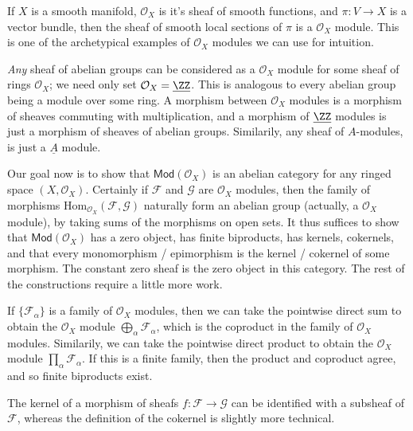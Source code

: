 \begin{example}
    If $X$ is a smooth manifold, $\mathcal{O}_X$ is it's sheaf of smooth functions, and $\pi: V \to X$ is a vector bundle, then the sheaf of smooth local sections of $\pi$ is a $\mathcal{O}_X$ module. This is one of the archetypical examples of $\mathcal{O}_X$ modules we can use for intuition.
\end{example}

\emph{Any} sheaf of abelian groups can be considered as a $\mathcal{O}_X$ module for some sheaf of rings $\mathcal{O}_X$; we need only set $\mathcal{O}_X = \underline{\ZZ}$. This is analogous to every abelian group being a module over some ring. A morphism between $\mathcal{O}_X$ modules is a morphism of sheaves commuting with multiplication, and a morphism of $\underline{\ZZ}$ modules is just a morphism of sheaves of abelian groups. Similarily, any sheaf of $A$-modules, is just a $\underline{A}$ module.

Our goal now is to show that $\mathsf{Mod}(\mathcal{O}_X)$ is an abelian category for any ringed space $(X,\mathcal{O}_X)$. Certainly if $\mathcal{F}$ and $\mathcal{G}$ are $\mathcal{O}_X$ modules, then the family of morphisms $\text{Hom}_{\mathcal{O}_X}(\mathcal{F},\mathcal{G})$ naturally form an abelian group (actually, a $\mathcal{O}_X$ module), by taking sums of the morphisms on open sets. It thus suffices to show that $\mathsf{Mod}(\mathcal{O}_X)$ has a zero object, has finite biproducts, has kernels, cokernels, and that every monomorphism / epimorphism is the kernel / cokernel of some morphism. The constant zero sheaf is the zero object in this category. The rest of the constructions require a little more work.

\begin{example}
    If $\{ \mathcal{F}_\alpha \}$ is a family of $\mathcal{O}_X$ modules, then we can take the pointwise direct sum to obtain the $\mathcal{O}_X$ module $\bigoplus_\alpha \mathcal{F}_\alpha$, which is the coproduct in the family of $\mathcal{O}_X$ modules. Similarily, we can take the pointwise direct product to obtain the $\mathcal{O}_X$ module $\prod_\alpha \mathcal{F}_\alpha$. If this is a finite family, then the product and coproduct agree, and so finite biproducts exist.
\end{example}

The kernel of a morphism of sheafs $f: \mathcal{F} \to \mathcal{G}$ can be identified with a subsheaf of $\mathcal{F}$, whereas the definition of the cokernel is slightly more technical.

